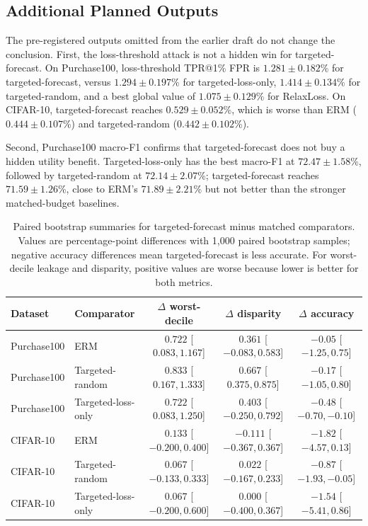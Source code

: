 \documentclass{article}
\newcommand{\purch}{Purchase100}
\newcommand{\cifar}{CIFAR-10}
\begin{document}
\subsection{Additional Planned Outputs}

The pre-registered outputs omitted from the earlier draft do not change the conclusion. First, the loss-threshold attack is not a hidden win for targeted-forecast. On \purch{}, loss-threshold TPR@1\% FPR is $1.281\pm0.182$\% for targeted-forecast, versus $1.294\pm0.197$\% for targeted-loss-only, $1.414\pm0.134$\% for targeted-random, and a best global value of $1.075\pm0.129$\% for RelaxLoss. On \cifar{}, targeted-forecast reaches $0.529\pm0.052$\%, which is worse than ERM ($0.444\pm0.107$\%) and targeted-random ($0.442\pm0.102$\%).

Second, Purchase100 macro-F1 confirms that targeted-forecast does not buy a hidden utility benefit. Targeted-loss-only has the best macro-F1 at $72.47\pm1.58$\%, followed by targeted-random at $72.14\pm2.07$\%; targeted-forecast reaches $71.59\pm1.26$\%, close to ERM's $71.89\pm2.21$\% but not better than the stronger matched-budget baselines.

\begin{table}[t]
\caption{Paired bootstrap summaries for targeted-forecast minus matched comparators. Values are percentage-point differences with 1{,}000 paired bootstrap samples; negative accuracy differences mean targeted-forecast is less accurate. For worst-decile leakage and disparity, positive values are worse because lower is better for both metrics.}
\label{tab:bootstrap}
\centering
\small
\begin{tabular}{llccc}
\toprule
Dataset & Comparator & $\Delta$ worst-decile & $\Delta$ disparity & $\Delta$ accuracy \\
\midrule
\purch{} & ERM & $0.722$ [$0.083, 1.167$] & $0.361$ [$-0.083, 0.583$] & $-0.05$ [$-1.25, 0.75$] \\
\purch{} & Targeted-random & $0.833$ [$0.167, 1.333$] & $0.667$ [$0.375, 0.875$] & $-0.17$ [$-1.05, 0.80$] \\
\purch{} & Targeted-loss-only & $0.722$ [$0.083, 1.250$] & $0.403$ [$-0.250, 0.792$] & $-0.48$ [$-0.70, -0.10$] \\
\cifar{} & ERM & $0.133$ [$-0.200, 0.400$] & $-0.111$ [$-0.367, 0.367$] & $-1.82$ [$-4.57, 0.13$] \\
\cifar{} & Targeted-random & $0.067$ [$-0.133, 0.333$] & $0.022$ [$-0.167, 0.233$] & $-0.87$ [$-1.93, -0.05$] \\
\cifar{} & Targeted-loss-only & $0.067$ [$-0.200, 0.600$] & $0.000$ [$-0.400, 0.367$] & $-1.54$ [$-5.41, 0.86$] \\
\bottomrule
\end{tabular}
\end{table}
\end{document}
